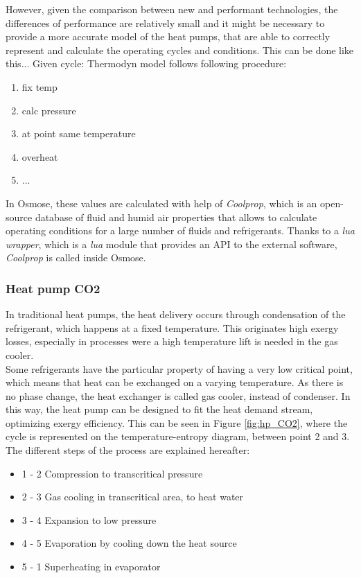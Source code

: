 \documentclass{article}
\begin{document}
However, given the comparison between new and performant technologies, the differences of performance are relatively small and it might be necessary to provide a more accurate model of the heat pumps, that are able to correctly represent and calculate the operating cycles and conditions. This can be done like this...
Given cycle:
Thermodyn model follows following procedure:
\begin{enumerate}
    \item fix temp
    \item calc pressure
    \item at point same temperature
    \item overheat
    \item ...
\end{enumerate}

In Osmose, these values are calculated with help of \textit{Coolprop}, which is an open-source database of fluid and humid air properties that allows to calculate operating conditions for a large number of fluids and refrigerants. Thanks to a \textit{lua wrapper}, which is a \textit{lua} module that provides an API to the external software, \textit{Coolprop} is called inside Osmose.

\subsubsection{Heat pump CO2}
In traditional heat pumps, the heat delivery occurs through condensation of the refrigerant, which happens at a fixed temperature. This originates high exergy losses, especially in processes were a high temperature lift is needed in the gas cooler.\\
Some refrigerants have the particular property of having a very low critical point, which means that heat can be exchanged on a varying temperature. As there is no phase change, the heat exchanger is called gas cooler, instead of condenser. In this way, the heat pump can be designed to fit the heat demand stream, optimizing exergy efficiency. This can be seen in Figure \ref{fig:hp_CO2}, where the cycle is represented on the temperature-entropy diagram, between point 2 and 3. The different steps of the process are explained hereafter: 
\begin{itemize}
\item 1 - 2 Compression to transcritical pressure
\item 2 - 3 Gas cooling in transcritical area, to heat water
\item 3 - 4 Expansion to low pressure
\item 4 - 5 Evaporation by cooling down the heat source
\item 5 - 1 Superheating in evaporator
\end{itemize}
\end{document}
